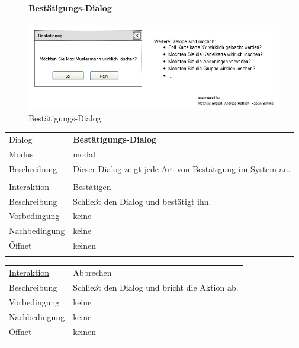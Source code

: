 \documentclass[12pt,a4paper]{article}
\begin{document}
{\begin{figure}[H]
	\centering
	\paragraph{Bestätigungs-Dialog}
	\includegraphics[width=\textwidth]{Bilder/Mockups/GUI/Bestaetigung.png}
	\caption{Bestätigungs-Dialog}
	\label{GuiBestaetigungsDialog}
\end{figure}
\begin{tabular}{l p{12cm}}
	Dialog 	 & \textbf{Bestätigungs-Dialog} \\ 
	Modus & modal\\ 
	Beschreibung   	& Dieser Dialog zeigt jede Art von Bestätigung im System an. \\\\
	
	\underline{Interaktion} 	 & Bestätigen\\ 
	Beschreibung   	& Schließt den Dialog und bestätigt ihn.\\
	Vorbedingung	& keine \\
	Nachbedingung	& keine \\
	Öffnet			& keinen\\\\
\end{tabular}

\begin{tabular}{l p{12cm}}
	\underline{Interaktion} 	 & Abbrechen\\ 
	Beschreibung   	& Schließt den Dialog und bricht die Aktion ab.\\
	Vorbedingung	& keine \\
	Nachbedingung	& keine \\
	Öffnet			& keinen\\\\
\end{tabular}

\begin{figure}[H]
	\centering

\end{figure}}
\end{document}
